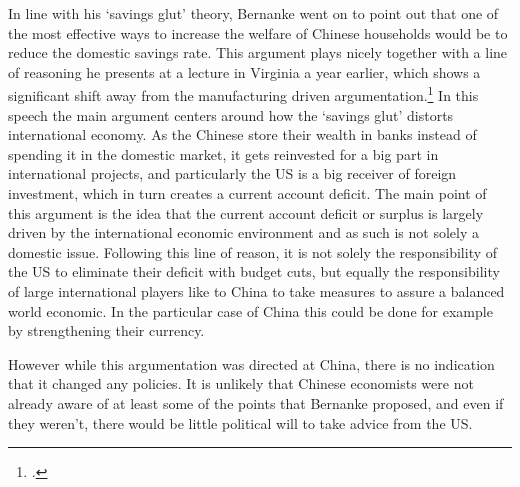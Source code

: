 In line with his `savings glut' theory, Bernanke went on to point out 
that one of the most effective ways to increase the welfare of Chinese 
households would be to reduce the domestic savings rate. This argument 
plays nicely together with a line of reasoning he presents at a lecture 
in Virginia a year earlier, which shows a significant shift away from 
the manufacturing driven argumentation.\footnote{\cite{Bernanke05}.} In this speech the main argument centers 
around how the `savings glut' distorts international economy.  As the 
Chinese store their wealth in banks instead of spending it in the 
domestic market, it gets reinvested for a big part in international 
projects, and particularly the US is a big receiver of foreign 
investment, which in turn creates a current account deficit.  The main 
point of this argument is the idea that the current account deficit or 
surplus is largely driven by the international economic environment and 
as such is not solely a domestic issue. Following this line of reason, 
it is not solely the responsibility of the US to eliminate their deficit 
with budget cuts, but equally the responsibility of large international 
players like to China to take measures to assure a balanced world 
economic. In the particular case of China this could be done for example 
by strengthening their currency.

However while this argumentation was directed at China, there is no 
indication that it changed any policies. It is unlikely that Chinese 
economists were not already aware of at least some of the points that 
Bernanke proposed, and even if they weren't, there would be little 
political will to take advice from the US.


